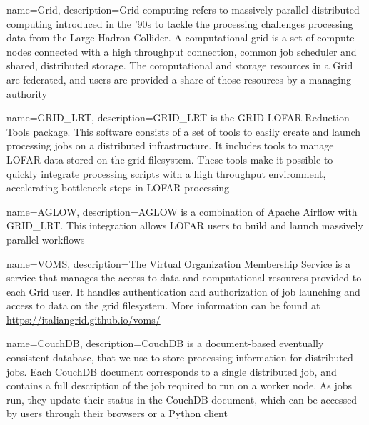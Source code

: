 {   
    name={Grid},
    description={Grid computing refers to massively parallel distributed computing introduced in the '90s to tackle the processing challenges processing data from the Large Hadron Collider. A computational grid is a set of compute nodes connected with a high throughput connection, common job scheduler and shared, distributed storage. The computational and storage resources in a Grid are federated, and users are provided a share of those resources by a managing authority }
}

{
    name={GRID\_LRT},
    description={GRID\_LRT is the GRID LOFAR Reduction Tools package. This software consists of a set of tools to easily create and launch processing jobs on a distributed infrastructure. It includes tools to manage LOFAR data stored on the grid filesystem. These tools make it possible to quickly integrate processing scripts with a high throughput environment, accelerating bottleneck steps in LOFAR processing }
}


{
    name={AGLOW},
    description={AGLOW is a combination of Apache Airflow with GRID\_LRT. This integration allows LOFAR users to build and launch massively parallel workflows
}}


{
    name=VOMS,
    description={The Virtual Organization Membership Service is a service that manages the access to data and computational resources provided to each Grid user. It handles authentication and authorization of job launching and access to data on the grid filesystem. More information can be found at \url{https://italiangrid.github.io/voms/} }
}

{
    name=CouchDB, 
    description={CouchDB is a document-based eventually consistent database, that we use to store processing information for distributed jobs. Each CouchDB document corresponds to a single distributed job, and contains a full description of the job required to run on a worker node. As jobs run, they update their status in the CouchDB document, which can be accessed by users through their browsers or a Python client}
}

